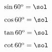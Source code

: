$\sin 60^{\textrm o}=\sol$

$\cos 60^{\textrm o}=\sol$

$\tan 60^{\textrm o}=\sol$

$\cot 60^{\textrm o}=\sol$
